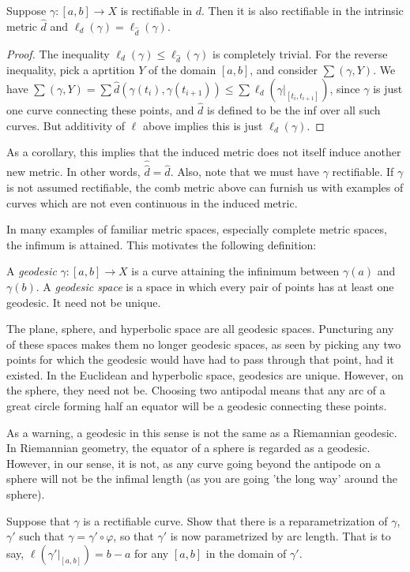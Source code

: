 \documentclass[12pt]{amsart}
\begin{document}
\begin{proposition}
Suppose $\gamma:[a,b] \to X$ is rectifiable in $d$. Then it is also rectifiable in the intrinsic metric $\hat{d}$ and $\ell_d (\gamma) = \ell_{\hat{d}} (\gamma)$.
\end{proposition}

\begin{proof}
The inequality $\ell_d (\gamma) \leq \ell_{\hat{d}} (\gamma)$ is completely trivial. For the reverse inequality, pick a aprtition $Y$ of the domain $[a,b]$, and consider $\sum(\gamma, Y)$. We have $\sum(\gamma, Y) = \sum \hat{d}(\gamma(t_i), \gamma(t_{i+1})) \leq \sum \ell_d(\gamma|_{[t_i, t_{i+1}]})$, since $\gamma$ is just one curve connecting these points, and $\hat{d}$ is defined to be the inf over all such curves. But additivity of $\ell$ above implies this is just $\ell_d (\gamma)$.
\end{proof}

As a corollary, this implies that the induced metric does not itself induce another new metric. In other words, $\hat{\hat{d}} = \hat{d}$. Also, note that we must have $\gamma$ rectifiable. If $\gamma$ is not assumed rectifiable, the comb metric above can furnish us with examples of curves which are not even continuous in the induced metric.

In many examples of familiar metric spaces, especially complete metric spaces, the infimum is attained. This motivates the following definition:

\begin{definition}
A \textit{geodesic} $\gamma:[a,b] \to X$ is a curve attaining the infinimum between $\gamma(a)$ and $\gamma(b)$. A \textit{geodesic space} is a space in which every pair of points has at least one geodesic. It need not be unique. 
\end{definition}

\begin{example}
The plane, sphere, and hyperbolic space are all geodesic spaces. Puncturing any of these spaces makes them no longer geodesic spaces, as seen by picking any two points for which the geodesic would have had to pass through that point, had it existed. In the Euclidean and hyperbolic space, geodesics are unique. However, on the sphere, they need not be. Choosing two antipodal means that any arc of a great circle forming half an equator will be a geodesic connecting these points.

As a warning, a geodesic in this sense is not the same as a Riemannian geodesic. In Riemannian geometry, the equator of a sphere is regarded as a geodesic. However, in our sense, it is not, as any curve going beyond the antipode on a sphere will not be the infimal length (as you are going 'the long way' around the sphere).
\end{example}

\begin{exercise}
Suppose that $\gamma$ is a rectifiable curve. Show that there is a reparametrization of $\gamma$, $\gamma'$ such that $\gamma = \gamma' \circ \varphi$, so that $\gamma'$ is now parametrized by arc length. That is to say, $\ell(\gamma'|_{[a,b]}) = b - a$ for any $[a,b]$ in the domain of $\gamma'$.
\end{exercise}
\end{document}
